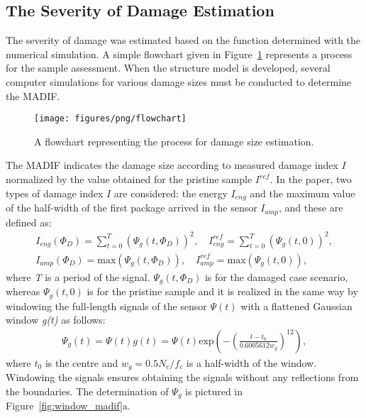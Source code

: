 \documentclass[sensors,article,accept,moreauthors,pdftex]{Definitions/mdpi}
\begin{document}
\begin{paracol}{2}
\section{The Severity of Damage Estimation}
\label{sec:severity}
The severity of damage was estimated based on the function determined with the numerical simulation.
A simple flowchart given in Figure~\ref{fig:Flowchart} represents a process for the sample assessment.
When the structure model is developed, several computer simulations for various damage sizes must be conducted to determine the MADIF.
\begin{figure}[H]
		\texttt{[image: figures/png/flowchart]}
	\caption{A flowchart representing the process for damage size estimation.}
	\label{fig:Flowchart}
\end{figure}
The MADIF indicates the damage size according to measured damage index \(I\) normalized by the value obtained for the pristine sample \(I^{ref}\).
In the paper, two types of damage index \(I\) are considered: the energy \(I_{eng}\) and the maximum value of the half-width of the first package arrived in the sensor \(I_{amp}\), and these are defined as:
\begin{eqnarray}
	I_{eng}(\Phi_D)=\sum_{t=0}^{T} \left (\Psi_g(t,\Phi_D)\right )^2,\quad I_{eng}^{ref}=\sum_{t=0}^{T} \left (\Psi_g(t,0)\right )^2,\\
	I_{amp}(\Phi_D)=\mathrm{max}\left ( \Psi_g(t,\Phi_D)\right ),\quad I_{amp}^{ref}=\mathrm{max}\left ( \Psi_g(t,0)\right ),
\label{eq:I_amp}
\end{eqnarray}
where \textit{T} is a period of the signal.
\(\Psi_g(t,\Phi_D)\) is for the damaged case scenario, whereas \(\Psi_g(t,0)\) is for the pristine sample and it is realized in the same way by windowing the full-length signals of the sensor \(\Psi(t)\) with a flattened Gaussian window \emph{g(t)} as follows:
\begin{eqnarray}
	\Psi_g(t)=\Psi(t)g(t)= \Psi(t)\mathrm{exp}\left(-\left(\frac{t-t_0}{0.6005612w_g}\right) ^{12}\right),
	\label{eq:psi_g}
\end{eqnarray}
where \(t_0\) is the centre and \(w_g=0.5N_c/f_c\) is a half-width of the window.
Windowing the signals ensures obtaining the signals without any reflections from the boundaries.
The determination of \(\Psi_g\) is pictured in Figure~\ref{fig:window_madif}a.


\end{paracol}
\end{document}
